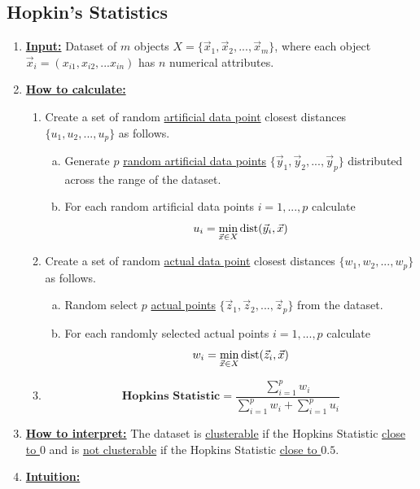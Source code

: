 \documentclass[11pt]{elegantbook}
\begin{document}
\subsection{Hopkin's Statistics}
\begin{enumerate}[$\bullet$]
    \item \textbf{\underline{Input:}} Dataset of $m$ objects $X=\{\vec{x}_1,\vec{x}_2,...,\vec{x}_m\}$, where each object $\vec{x}_i=(x_{i1},x_{i2},...x_{in})$ has $n$ numerical attributes.
    \item \textbf{\underline{How to calculate:}}
    \begin{enumerate}[$(1)$]
        \item Create a set of random \underline{artificial data point} closest distances $\{u_1,u_2,...,u_p\}$ as follows.
        \begin{enumerate}[a)]
            \item Generate $p$ \underline{random artificial data points} $\{\vec{y}_1, \vec{y}_2, ... , \vec{y}_p\}$ distributed across
            the range of the dataset.
            \item For each random artificial data points $i=1,...,p$ calculate $$u_i=\min_{\vec{x}\in X}\textnormal{dist}(\vec{y}_i,\vec{x})$$
        \end{enumerate}
        \item Create a set of random \underline{actual data point} closest distances $\{w_1,w_2,...,w_p\}$ as follows.
        \begin{enumerate}[a)]
            \item Random select $p$ \underline{actual points} $\{\vec{z}_1, \vec{z}_2, ... , \vec{z}_p\}$ from the dataset.
            \item For each randomly selected actual points $i=1,...,p$ calculate $$w_i=\min_{\vec{x}\in X}\textnormal{dist}(\vec{z}_i,\vec{x})$$
        \end{enumerate}
        \item $$\textbf{Hopkins Statistic}=\frac{\sum_{i=1}^p w_i}{\sum_{i=1}^p w_i+\sum_{i=1}^p u_i}$$
    \end{enumerate}
    \item \textbf{\underline{How to interpret:}} The dataset is \underline{clusterable} if the Hopkins Statistic \underline{close to $0$} and is \underline{not clusterable} if the Hopkins Statistic \underline{close to $0.5$}.
    \item \textbf{\underline{Intuition:}}
    \begin{center}\begin{figure}[htbp]

\end{figure}
\end{center}
\end{enumerate}
\end{document}
